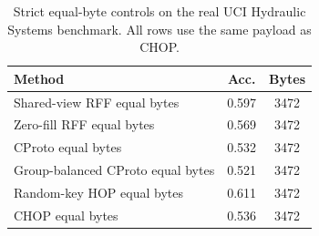 \begin{table}[t]
\centering
\caption{Strict equal-byte controls on the real UCI Hydraulic Systems benchmark. All rows use the same payload as CHOP.}
\label{tab:strict-equal-byte-hydraulic}
\begin{tabular}{lcc}
\toprule
Method & Acc. & Bytes \\
\midrule
Shared-view RFF equal bytes & 0.597 & 3472 \\
Zero-fill RFF equal bytes & 0.569 & 3472 \\
CProto equal bytes & 0.532 & 3472 \\
Group-balanced CProto equal bytes & 0.521 & 3472 \\
Random-key HOP equal bytes & 0.611 & 3472 \\
CHOP equal bytes & 0.536 & 3472 \\
\bottomrule
\end{tabular}
\end{table}

